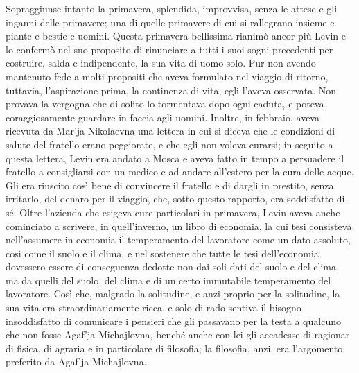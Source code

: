Sopraggiunse intanto la primavera, splendida, improvvisa, senza le attese e gli inganni delle primavere; una di quelle primavere di cui si rallegrano insieme e piante e bestie e uomini. Questa primavera bellissima rianimò ancor più Levin e lo confermò nel suo proposito di rinunciare a tutti i suoi sogni precedenti per costruire, salda e indipendente, la sua vita di uomo solo. Pur non avendo mantenuto fede a molti propositi che aveva formulato nel viaggio di ritorno, tuttavia, l'aspirazione prima, la continenza di vita, egli l'aveva osservata. Non provava la vergogna che di solito lo tormentava dopo ogni caduta, e poteva coraggiosamente guardare in faccia agli uomini. Inoltre, in febbraio, aveva ricevuta da Mar'ja Nikolaevna una lettera in cui si diceva che le condizioni di salute del fratello erano peggiorate, e che egli non voleva curarsi; in seguito a questa lettera, Levin era andato a Mosca e aveva fatto in tempo a persuadere il fratello a consigliarsi con un medico e ad andare all'estero per la cura delle acque. Gli era riuscito così bene di convincere il fratello e di dargli in prestito, senza irritarlo, del denaro per il viaggio, che, sotto questo rapporto, era soddisfatto di sé. Oltre l'azienda che esigeva cure particolari in primavera, Levin aveva anche cominciato a scrivere, in quell'inverno, un libro di economia, la cui tesi consisteva nell'assumere in economia il temperamento del lavoratore come un dato assoluto, così come il suolo e il clima, e nel sostenere che tutte le tesi dell'economia dovessero essere di conseguenza dedotte non dai soli dati del suolo e del clima, ma da quelli del suolo, del clima e di un certo immutabile temperamento del lavoratore. Così che, malgrado la solitudine, e anzi proprio per la solitudine, la sua vita era straordinariamente ricca, e solo di rado sentiva il bisogno insoddisfatto di comunicare i pensieri che gli passavano per la testa a qualcuno che non fosse Agaf'ja Michajlovna, benché anche con lei gli accadesse di ragionar di fisica, di agraria e in particolare di filosofia; la filosofia, anzi, era l'argomento preferito da Agaf'ja Michajlovna. 
\enlargethispage{\baselineskip}
